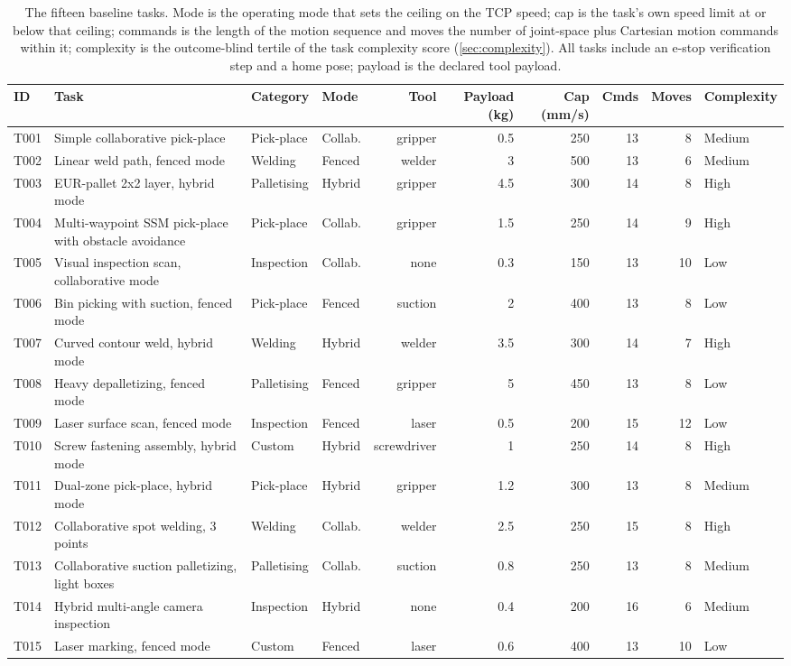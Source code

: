 \begin{table}[t]
\caption{The fifteen baseline tasks. Mode is the operating mode that sets the ceiling on the TCP
speed; cap is the task's own speed limit at or below that ceiling; commands is the length of the motion sequence and moves the number of
joint-space plus Cartesian motion commands within it; complexity is the outcome-blind
tertile of the task complexity score (\ref{sec:complexity}). All tasks include an
e-stop verification step and a home pose; payload is the declared tool payload.}
\label{tab:tasks}
\centering
\footnotesize
\setlength{\tabcolsep}{2.5pt}
\begin{tabular}{@{}llllrrrrrl@{}}
\toprule
ID & Task & Category & Mode & Tool & Payload (kg) & Cap (mm/s) & Cmds & Moves & Complexity \\
\midrule
T001 & Simple collaborative pick-place & Pick-place & Collab. & gripper & 0.5 & 250 & 13 & 8 & Medium \\
T002 & Linear weld path, fenced mode & Welding & Fenced & welder & 3 & 500 & 13 & 6 & Medium \\
T003 & EUR-pallet 2x2 layer, hybrid mode & Palletising & Hybrid & gripper & 4.5 & 300 & 14 & 8 & High \\
T004 & Multi-waypoint SSM pick-place with obstacle avoidance & Pick-place & Collab. & gripper & 1.5 & 250 & 14 & 9 & High \\
T005 & Visual inspection scan, collaborative mode & Inspection & Collab. & none & 0.3 & 150 & 13 & 10 & Low \\
T006 & Bin picking with suction, fenced mode & Pick-place & Fenced & suction & 2 & 400 & 13 & 8 & Low \\
T007 & Curved contour weld, hybrid mode & Welding & Hybrid & welder & 3.5 & 300 & 14 & 7 & High \\
T008 & Heavy depalletizing, fenced mode & Palletising & Fenced & gripper & 5 & 450 & 13 & 8 & Low \\
T009 & Laser surface scan, fenced mode & Inspection & Fenced & laser & 0.5 & 200 & 15 & 12 & Low \\
T010 & Screw fastening assembly, hybrid mode & Custom & Hybrid & screwdriver & 1 & 250 & 14 & 8 & High \\
T011 & Dual-zone pick-place, hybrid mode & Pick-place & Hybrid & gripper & 1.2 & 300 & 13 & 8 & Medium \\
T012 & Collaborative spot welding, 3 points & Welding & Collab. & welder & 2.5 & 250 & 15 & 8 & High \\
T013 & Collaborative suction palletizing, light boxes & Palletising & Collab. & suction & 0.8 & 250 & 13 & 8 & Medium \\
T014 & Hybrid multi-angle camera inspection & Inspection & Hybrid & none & 0.4 & 200 & 16 & 6 & Medium \\
T015 & Laser marking, fenced mode & Custom & Fenced & laser & 0.6 & 400 & 13 & 10 & Low \\
\bottomrule
\end{tabular}
\end{table}
